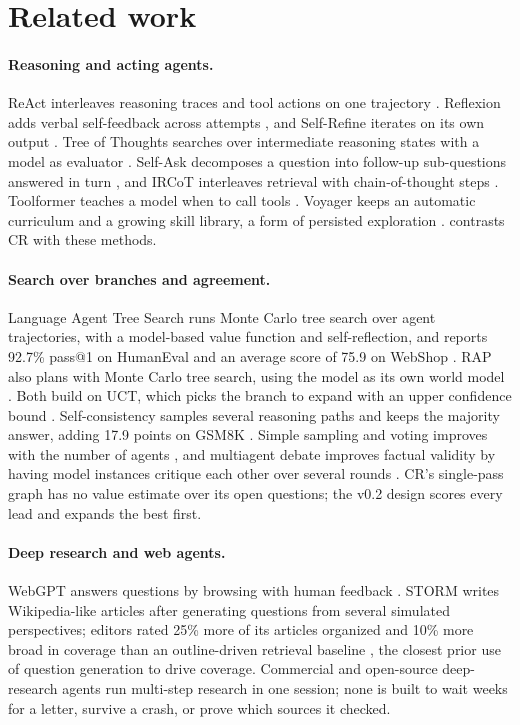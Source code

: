 \section{Related work}
\label{sec:related}

\paragraph{Reasoning and acting agents.} ReAct interleaves reasoning traces and tool actions on one trajectory \citep{yao2023react}. Reflexion adds verbal self-feedback across attempts \citep{shinn2023reflexion}, and Self-Refine iterates on its own output \citep{madaan2023selfrefine}. Tree of Thoughts searches over intermediate reasoning states with a model as evaluator \citep{yao2023tot}. Self-Ask decomposes a question into follow-up sub-questions answered in turn \citep{press2023selfask}, and IRCoT interleaves retrieval with chain-of-thought steps \citep{trivedi2023ircot}. Toolformer teaches a model when to call tools \citep{schick2023toolformer}. Voyager keeps an automatic curriculum and a growing skill library, a form of persisted exploration \citep{wang2023voyager}.  contrasts CR with these methods.

\paragraph{Search over branches and agreement.} Language Agent Tree Search runs Monte Carlo tree search over agent trajectories, with a model-based value function and self-reflection, and reports 92.7\% pass@1 on HumanEval and an average score of 75.9 on WebShop \citep{zhou2024lats}. RAP also plans with Monte Carlo tree search, using the model as its own world model \citep{hao2023rap}. Both build on UCT, which picks the branch to expand with an upper confidence bound \citep{kocsis2006uct,auer2002ucb}. Self-consistency samples several reasoning paths and keeps the majority answer, adding 17.9 points on GSM8K \citep{wang2023selfconsistency}. Simple sampling and voting improves with the number of agents \citep{li2024moreagents}, and multiagent debate improves factual validity by having model instances critique each other over several rounds \citep{du2024debate}. CR's single-pass graph has no value estimate over its open questions; the v0.2 design scores every lead and expands the best first.

\paragraph{Deep research and web agents.} WebGPT answers questions by browsing with human feedback \citep{nakano2021webgpt}. STORM writes Wikipedia-like articles after generating questions from several simulated perspectives; editors rated 25\% more of its articles organized and 10\% more broad in coverage than an outline-driven retrieval baseline \citep{shao2024storm}, the closest prior use of question generation to drive coverage. Commercial \citep{openai2025deepresearch} and open-source \citep{elovic2023gptresearcher} deep-research agents run multi-step research in one session; none is built to wait weeks for a letter, survive a crash, or prove which sources it checked.

